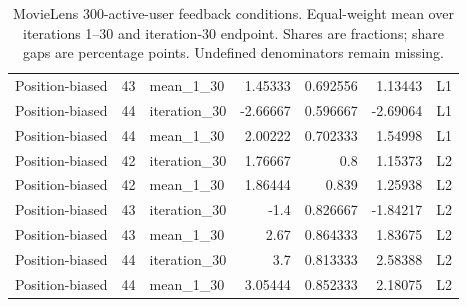\begin{table}[htbp!]
\begin{tabular}{lrlrrrl}
Position-biased & 43 & mean\_1\_30 & 1.45333 & 0.692556 & 1.13443 & L1 \\
Position-biased & 44 & iteration\_30 & -2.66667 & 0.596667 & -2.69064 & L1 \\
Position-biased & 44 & mean\_1\_30 & 2.00222 & 0.702333 & 1.54998 & L1 \\
Position-biased & 42 & iteration\_30 & 1.76667 & 0.8 & 1.15373 & L2 \\
Position-biased & 42 & mean\_1\_30 & 1.86444 & 0.839 & 1.25938 & L2 \\
Position-biased & 43 & iteration\_30 & -1.4 & 0.826667 & -1.84217 & L2 \\
Position-biased & 43 & mean\_1\_30 & 2.67 & 0.864333 & 1.83675 & L2 \\
Position-biased & 44 & iteration\_30 & 3.7 & 0.813333 & 2.58388 & L2 \\
Position-biased & 44 & mean\_1\_30 & 3.05444 & 0.852333 & 2.18075 & L2 \\
\hline
\end{tabular}
\caption{MovieLens 300-active-user feedback conditions. Equal-weight mean over iterations 1--30 and iteration-30 endpoint. Shares are fractions; share gaps are percentage points. Undefined denominators remain missing.}
\label{chap:results:tab:rq1_feedback_click_exposure}
\end{table}
